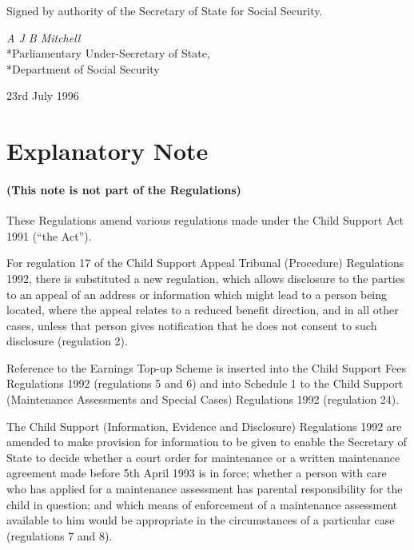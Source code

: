 \documentclass[12pt,a4paper]{article}
\begin{document}

\bigskip

Signed by authority of the Secretary of State for Social Security.

{\raggedleft
\emph{A J B Mitchell}\\*Parliamentary Under-Secretary of State,\\*Department of Social Security

}

23rd July 1996

\bigskip

\small

\part{Explanatory Note}

\renewcommand\parthead{--- Explanatory Note}

\subsection*{(This note is not part of the Regulations)}

These Regulations amend various regulations made under the Child Support Act 1991 (“the Act”).

  For regulation 17 of the Child Support Appeal Tribunal (Procedure) Regulations 1992, there is substituted a new regulation, which allows disclosure to the parties to an appeal of an address or information which might lead to a person being located, where the appeal relates to a reduced benefit direction, and in all other cases, unless that person gives notification that he does not consent to such disclosure (regulation 2).

  Reference to the Earnings Top-up Scheme is inserted into the Child Support Fees Regulations 1992 (regulations 5 and 6) and into Schedule 1 to the Child Support (Maintenance Assessments and Special Cases) Regulations 1992 (regulation 24).

  The Child Support (Information, Evidence and Disclosure) Regulations 1992 are amended to make provision for information to be given to enable the Secretary of State to decide whether a court order for maintenance or a written maintenance agreement made before 5th April 1993 is in force; whether a person with care who has applied for a maintenance assessment has parental responsibility for the child in question; and which means of enforcement of a maintenance assessment available to him would be appropriate in the circumstances of a particular case (regulations 7 and 8).
\end{document}
